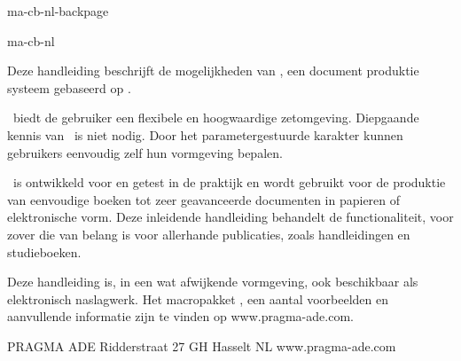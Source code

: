 \startonderdeel ma-cb-nl-backpage

\produkt ma-cb-nl

Deze handleiding beschrijft de mogelijkheden van \CONTEXT,
een document produktie systeem gebaseerd op \TEX.

\vfil

\CONTEXT\ biedt de gebruiker een flexibele en hoogwaardige
zetomgeving. Diepgaande kennis van \TEX\ is niet nodig.
Door het parametergestuurde karakter kunnen gebruikers
eenvoudig zelf hun vormgeving bepalen.

\vfil

\CONTEXT\ is ontwikkeld voor en getest in de praktijk en
wordt gebruikt voor de produktie van eenvoudige boeken tot
zeer geavanceerde documenten in papieren of elektronische
vorm. Deze inleidende handleiding behandelt de
functionaliteit, voor zover die van belang is voor
allerhande publicaties, zoals handleidingen en
studieboeken.

\vfil

Deze handleiding is, in een wat afwijkende vormgeving, ook
beschikbaar als elektronisch naslagwerk. Het macropakket
\CONTEXT, een aantal voorbeelden en aanvullende informatie
zijn te vinden op www.pragma-ade.com.

\vfil

PRAGMA ADE          \break
Ridderstraat 27      GH Hasselt NL  \break
www.pragma-ade.com

\stoponderdeel
